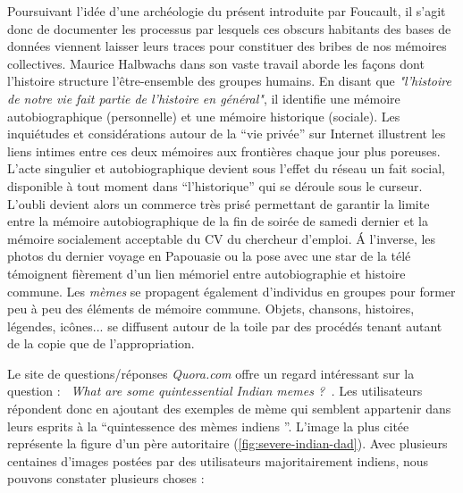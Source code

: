 Poursuivant l{\textquoteright}idée d{\textquoteright}une archéologie du présent introduite par Foucault, il s{\textquoteright}agit donc de documenter les processus par lesquels ces obscurs habitants des bases de données viennent laisser leurs traces pour constituer des bribes de nos mémoires collectives. Maurice Halbwachs dans son vaste travail aborde les fa\c{c}ons dont l{\textquoteright}histoire structure l{\textquoteright}être-ensemble des groupes humains. En disant que \textit{"l'histoire de notre vie fait partie de l'histoire en général"}\citep{Halbwachs1947}, il identifie une mémoire autobiographique (personnelle) et une mémoire historique (sociale). Les inquiétudes et considérations autour de la {\textquotedblleft}vie privée{\textquotedblright} sur Internet illustrent les liens intimes entre ces deux mémoires aux frontières chaque jour plus poreuses. L{\textquoteright}acte singulier et autobiographique devient sous l{\textquoteright}effet du réseau un fait social, disponible à tout moment dans {\textquotedblleft}l{\textquoteright}historique{\textquotedblright} qui se déroule sous le curseur. L{\textquoteright}oubli devient alors un commerce très prisé permettant de garantir la limite entre la mémoire autobiographique de la fin de soirée de samedi dernier et la mémoire socialement acceptable du CV du chercheur d{\textquoteright}emploi. \'A l{\textquoteright}inverse, les photos du dernier voyage en Papouasie ou la pose avec une star de la télé témoignent fièrement d{\textquoteright}un lien mémoriel entre autobiographie et histoire commune. Les \textit{mèmes} se propagent également d{\textquoteright}individus en groupes pour former peu à peu des éléments de mémoire commune. Objets, chansons, histoires, légendes, icônes... se diffusent autour de la toile par des procédés tenant autant de la copie que de l{\textquoteright}appropriation. 

Le site de questions/réponses \textit{Quora.com} offre un regard intéressant sur la question : \textit{{\guillemotleft}~What are some quintessential Indian memes ?~{\guillemotright}.} Les utilisateurs répondent donc en ajoutant des exemples de mème qui semblent appartenir dans leurs esprits à la {\textquotedblleft}quintessence des mèmes indiens {\textquotedblright}. L{\textquoteright}image la plus citée représente la figure d{\textquoteright}un père autoritaire (\ref{fig:severe-indian-dad}). Avec plusieurs centaines d{\textquoteright}images postées par des
utilisateurs majoritairement indiens, nous pouvons constater plusieurs choses : 

